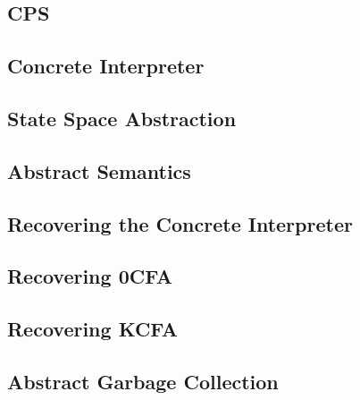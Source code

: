 \subsection{CPS}


\subsection{Concrete Interpreter}


\subsection{State Space Abstraction}


\subsection{Abstract Semantics}


\subsection{Recovering the Concrete Interpreter}


\subsection{Recovering 0CFA}


\subsection{Recovering KCFA}


\subsection{Abstract Garbage Collection}

